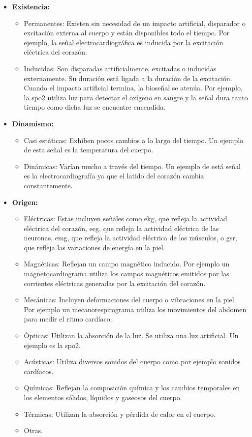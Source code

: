 \begin{itemize}
	\item \textbf{Existencia:}
		\begin{itemize}
			\item Permanentes: Existen sin necesidad de un impacto artificial, disparador o excitación externa al cuerpo y están disponibles todo el tiempo. Por ejemplo, la señal electrocardiográfica es inducida por la excitación eléctrica del corazón.
			\item Inducidas: Son disparadas artificialmente, excitadas o inducidas externamente. Su duración está ligada a la duración de la excitación. Cuando el impacto artificial termina, la bioseñal se atenúa. Por ejemplo, la \gls{spo2} utiliza luz para detectar el oxígeno en sangre y la señal dura tanto tiempo como dicha luz se encuentre encendida.
		\end{itemize}
	\item \textbf{Dinamismo:}
		\begin{itemize}
			\item Casi estáticas:  Exhiben pocos cambios a lo largo del tiempo. Un ejemplo de esta señal es la temperatura del cuerpo.
			\item Dinámicas: Varían mucho a través del tiempo. Un ejemplo de está señal es la electrocardiografía ya que el latido del corazón cambia constantemente.
		\end{itemize}
	\item \textbf{Origen:}
		\begin{itemize}
			\item Eléctricas: Estas incluyen señales como \gls{ekg}, que refleja la actividad eléctrica del corazón, \gls{eeg}, que refleja la actividad eléctrica de las neuronas,  \gls{emg}, que refleja la actividad eléctrica de los músculos, o \gls{gsr}, que refleja las variaciones de energía en la piel.
			\item Magnéticas: Reflejan un campo magnético inducido. Por ejemplo un magnetocardiograma utiliza los campos magnéticos emitidos por las corrientes eléctricas generadas por la excitación del corazón.
			\item Mecánicas: Incluyen deformaciones del cuerpo o vibraciones en la piel. Por ejemplo un mecanorespirograma utiliza los movimientos del abdomen para medir el ritmo cardíaco.
			\item Ópticas: Utilizan la absorción de la luz. Se utiliza una luz artificial. Un ejemplo es la \gls{spo2}.
			\item Acústicas: Utiliza diversos sonidos del cuerpo como por ejemplo sonidos cardíacos.
			\item Químicas: Reflejan la composición química y los cambios temporales en los elementos sólidos, líquidos y gaseosos del cuerpo.
			\item Térmicas: Utilizan la absorción y pérdida de calor en el cuerpo.
			\item Otras.
	\end{itemize}
\end{itemize}

